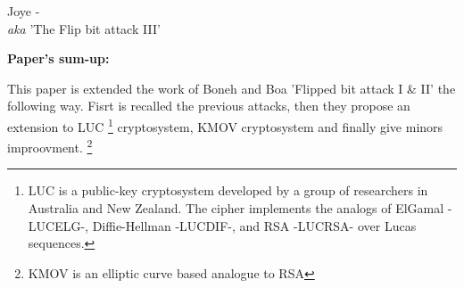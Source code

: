 \item Joye - \\
\textit{aka} 'The Flip bit attack III'

\textbf{Paper's sum-up:}

This paper is extended the work of Boneh and Boa 'Flipped bit attack I \& II' the following way.
Fisrt is recalled the previous attacks, then they propose an extension to LUC
\footnote{LUC is a public-key cryptosystem developed by a group of researchers in Australia and New
Zealand. The cipher implements the analogs of ElGamal -LUCELG-, Diffie-Hellman -LUCDIF-, and RSA 
-LUCRSA- over Lucas sequences.} cryptosystem, KMOV cryptosystem and finally give minors improovment.
\footnote{KMOV is an elliptic curve based analogue to RSA}
